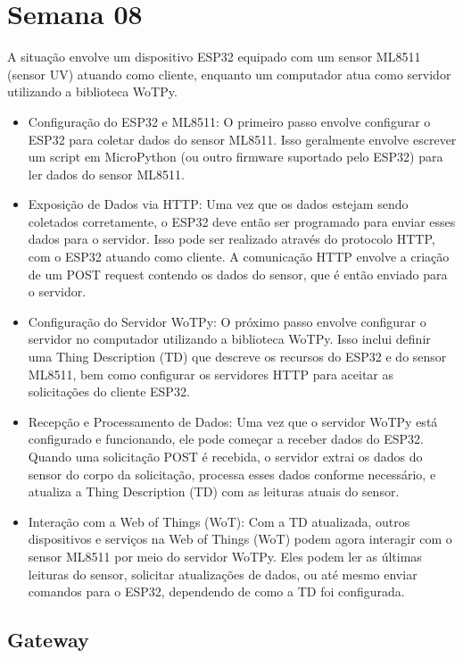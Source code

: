 
\section{Semana 08}

A situação envolve um dispositivo ESP32 equipado com um sensor ML8511 (sensor UV) atuando como cliente, enquanto um computador atua como servidor utilizando a biblioteca WoTPy. 

\begin{itemize}
    \item Configuração do ESP32 e ML8511: O primeiro passo envolve configurar o ESP32 para coletar dados do sensor ML8511. Isso geralmente envolve escrever um script em MicroPython (ou outro firmware suportado pelo ESP32) para ler dados do sensor ML8511.
    \item Exposição de Dados via HTTP: Uma vez que os dados estejam sendo coletados corretamente, o ESP32 deve então ser programado para enviar esses dados para o servidor. Isso pode ser realizado através do protocolo HTTP, com o ESP32 atuando como cliente. A comunicação HTTP envolve a criação de um POST request contendo os dados do sensor, que é então enviado para o servidor.
    \item Configuração do Servidor WoTPy: O próximo passo envolve configurar o servidor no computador utilizando a biblioteca WoTPy. Isso inclui definir uma Thing Description (TD) que descreve os recursos do ESP32 e do sensor ML8511, bem como configurar os servidores HTTP para aceitar as solicitações do cliente ESP32.
    \item Recepção e Processamento de Dados: Uma vez que o servidor WoTPy está configurado e funcionando, ele pode começar a receber dados do ESP32. Quando uma solicitação POST é recebida, o servidor extrai os dados do sensor do corpo da solicitação, processa esses dados conforme necessário, e atualiza a Thing Description (TD) com as leituras atuais do sensor.
    \item Interação com a Web of Things (WoT): Com a TD atualizada, outros dispositivos e serviços na Web of Things (WoT) podem agora interagir com o sensor ML8511 por meio do servidor WoTPy. Eles podem ler as últimas leituras do sensor, solicitar atualizações de dados, ou até mesmo enviar comandos para o ESP32, dependendo de como a TD foi configurada.
\end{itemize}

\subsection{Gateway}

